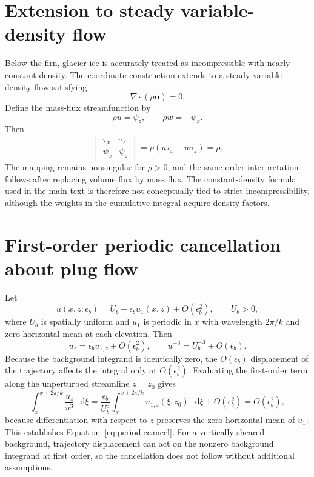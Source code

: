 \documentclass[review]{igs}
\theoremstyle{definition}
\theoremstyle{remark}
\newcommand{\dd}{\mathop{}\!\mathrm{d}}
\newcommand{\uvec}{\bm{u}}
\begin{document}
\section{Extension to steady variable-density flow}
\label{app:density}

Below the firn, glacier ice is accurately treated as incompressible with nearly constant density. The coordinate construction extends to a steady variable-density flow satisfying
\begin{equation}
\nabla\cdot(\rho\uvec)=0.
\end{equation}
Define the mass-flux streamfunction by
\begin{equation}
\rho u=\psi_z,
\qquad
\rho w=-\psi_x.
\end{equation}
Then
\begin{equation}
\begin{vmatrix}
\tau_x & \tau_z \\
\psi_x & \psi_z
\end{vmatrix}
=\rho(u\tau_x+w\tau_z)=\rho.
\end{equation}
The mapping remains nonsingular for \(\rho>0\), and the same order interpretation follows after replacing volume flux by mass flux. The constant-density formula used in the main text is therefore not conceptually tied to strict incompressibility, although the weights in the cumulative integral acquire density factors.

\section{First-order periodic cancellation about plug flow}
\label{app:periodic}

Let
\begin{equation}
 u(x,z;\epsilon_b)=U_b+\epsilon_b u_1(x,z)+O(\epsilon_b^2),
 \qquad U_b>0,
\end{equation}
where \(U_b\) is spatially uniform and \(u_1\) is periodic in \(x\) with wavelength \(2\pi/k\) and zero horizontal mean at each elevation. Then
\begin{equation}
 u_z=\epsilon_b u_{1,z}+O(\epsilon_b^2),
 \qquad
 u^{-3}=U_b^{-3}+O(\epsilon_b).
\end{equation}
Because the background integrand is identically zero, the \(O(\epsilon_b)\) displacement of the trajectory affects the integral only at \(O(\epsilon_b^2)\). Evaluating the first-order term along the unperturbed streamline \(z=z_0\) gives
\begin{equation}
\int_x^{x+2\pi/k}\frac{u_z}{u^3}\,\dd\xi
=\frac{\epsilon_b}{U_b^3}
\int_x^{x+2\pi/k}u_{1,z}(\xi,z_0)\,\dd\xi
+O(\epsilon_b^2)
=O(\epsilon_b^2),
\end{equation}
because differentiation with respect to \(z\) preserves the zero horizontal mean of \(u_1\). This establishes Equation~\eqref{eq:periodiccancel}. For a vertically sheared background, trajectory displacement can act on the nonzero background integrand at first order, so the cancellation does not follow without additional assumptions.
\end{document}

